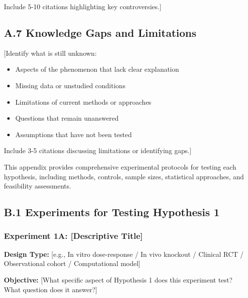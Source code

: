 \documentclass[11pt,letterpaper]{article}
\begin{document}
Include 5-10 citations highlighting key controversies.]

\subsection*{A.7 Knowledge Gaps and Limitations}

[Identify what is still unknown:
\begin{itemize}
  \item Aspects of the phenomenon that lack clear explanation
  \item Missing data or unstudied conditions
  \item Limitations of current methods or approaches
  \item Questions that remain unanswered
  \item Assumptions that have not been tested
\end{itemize}

Include 3-5 citations discussing limitations or identifying gaps.]

\newpage
{}

This appendix provides comprehensive experimental protocols for testing each hypothesis, including methods, controls, sample sizes, statistical approaches, and feasibility assessments.

\subsection*{B.1 Experiments for Testing Hypothesis 1}

\subsubsection*{Experiment 1A: [Descriptive Title]}

\textbf{Design Type:} [e.g., In vitro dose-response / In vivo knockout / Clinical RCT / Observational cohort / Computational model]

\textbf{Objective:} [What specific aspect of Hypothesis 1 does this experiment test? What question does it answer?]
\end{document}
